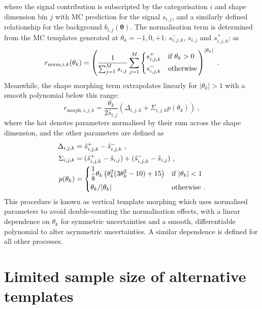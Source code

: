 where the signal contribution is subscripted by the categorisation $i$ and shape dimension bin $j$ with MC prediction for the signal $s_{i,j}$, and a similarly defined relationship for the background $b_{i,j}(\bm{\theta})$. The normalisation term is determined from the MC templates generated at ${\theta_k=-1,0,+1}$: $s_{i,j,k}^{-}$, $s_{i,j}$ and $s_{i,j,k}^{+}$; as
%
\begin{equation}
    r_{\mathrm{norm},i,k}(\theta_k) = \left(\frac{1}{\sum_{j=1}^{M}s_{i,j}}\sum_{j=1}^{M}
    \begin{dcases}
        s_{i,j,k}^+ & \text{if }\theta_k> 0\\
        s_{i,j,k}^- & \text{otherwise}
    \end{dcases}\right)^{|\theta_k|}\ .
\end{equation}
%
Meanwhile, the shape morphing term extrapolates linearly for $|\theta_k|>1$ with a smooth polynomial below this range:
%
\begin{equation}
    r_{\mathrm{morph},i,j,k} = \frac{\theta_k}{2\hat{s}_{i,j}}\left(\Delta_{i,j,k} + \Sigma_{i,j,k}p(\theta_k)\right)\ ,
\end{equation}
%
where the hat denotes parameters normalised by their sum across the shape dimension, and the other parameters are defined as
%
\begin{align}
    \Delta_{i,j,k} & = \hat{s}_{i,j,k}^+ - \hat{s}_{i,j,k}^-\ ,\\
    \Sigma_{i,j,k} & = (\hat{s}_{i,j,k}^+-\hat{s}_{i,j}) + (\hat{s}_{i,j,k}^{-}-\hat{s}_{i,j})\ ,\\
    p(\theta_k) & =
    \begin{dcases}
        \frac{1}{8}\theta_k\left(\theta_k^2(3\theta_k^2-10)+15\right) & \text{if }|\theta_k|< 1 \\
        \theta_k/|\theta_k| & \text{otherwise}\ .
    \end{dcases}
\end{align}
%
This procedure is known as vertical template morphing\cite{Conway:2011in} which uses normalised parameters to avoid double-counting the normalisation effects, with a linear dependence on $\theta_k$ for symmetric uncertainties and a smooth, differentiable polynomial to alter asymmetric uncertainties. A similar dependence is defined for all other processes.


\section{Limited sample size of alternative templates}\label{appsec:alt_temp_smooth}

